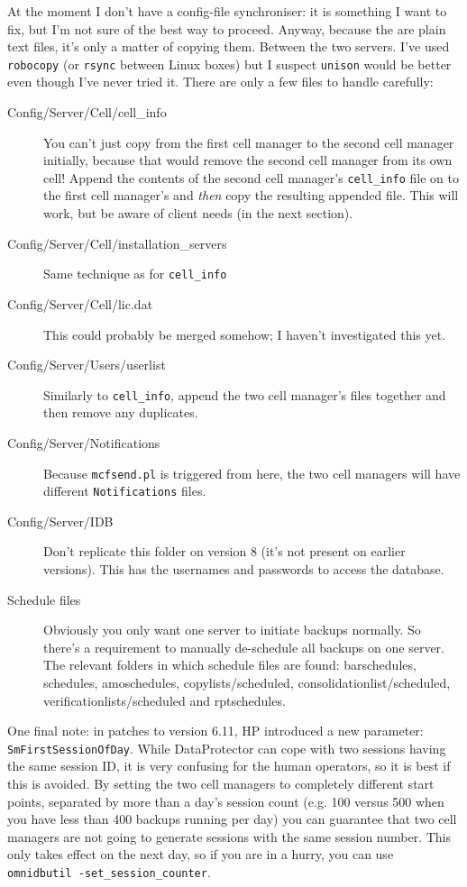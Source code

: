 \documentclass{article}
\begin{document}
At the moment I don't have a config-file synchroniser: it is something I want to fix, but I'm not sure of the best way to proceed. Anyway, because the are plain text files, it's only a matter
of copying them. Between the two servers. I've used {\tt robocopy} (or {\tt rsync} between Linux boxes) but I suspect {\tt unison} would be better even though I've never tried it. There are only a few files to handle carefully:
\begin{description}
\item[Config/Server/Cell/cell\_info] You can't just copy from the first cell manager to the second cell manager initially, because that would remove the second cell manager from its own cell! Append the contents of the second cell manager's {\tt cell\_info} file on to the first cell manager's and {\it then} copy the resulting appended file. This will work, but be aware of client needs (in the next section).
\item[Config/Server/Cell/installation\_servers] Same technique as for {\tt cell\_info}
\item[Config/Server/Cell/lic.dat] This could probably be merged somehow; I haven't investigated this yet.
\item[Config/Server/Users/userlist] Similarly to {\tt cell\_info}, append the two cell manager's files together and then remove any duplicates.
\item[Config/Server/Notifications] Because {\tt mcfsend.pl} is triggered from here, the two cell managers will have different {\tt Notifications} files.
\item[Config/Server/IDB] Don't replicate this folder on version 8 (it's not present on earlier versions). This has the usernames and passwords to access the database.
\item[Schedule files] Obviously you only want one server to initiate backups normally. So there's a requirement to manually de-schedule all backups on one server. The
relevant folders in which schedule files are found: barschedules, schedules, amoschedules, copylists/scheduled, consolidationlist/scheduled, verificationlists/scheduled and rptschedules. 
\end{description}

One final note: in patches to version 6.11, HP introduced a new parameter: {\tt SmFirstSessionOfDay}. While DataProtector can cope with two sessions having the same session ID, it is very confusing for the human operators, so it is best if this is avoided. By setting the two cell managers to completely different start points, separated by more than a day's session count (e.g. 100 versus 500 when you have less than 400 backups running per day) you can guarantee that two cell managers are not going to generate sessions with the same session number. This only takes effect on the next day, so if you are in a hurry, you can use {\tt omnidbutil -set\_session\_counter}.
\end{document}
